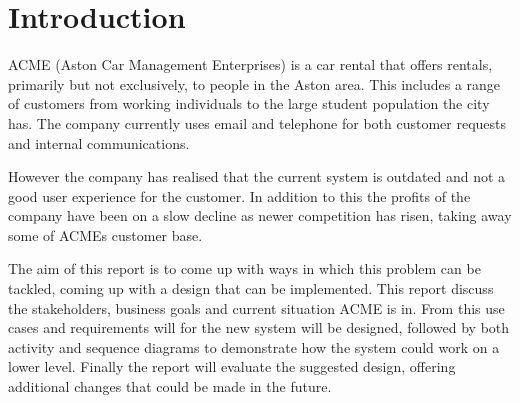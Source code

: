 \section{Introduction}
ACME (Aston Car Management Enterprises) is a car rental that offers rentals, primarily but not exclusively, to people in the Aston area.
This includes a range of customers from working individuals to the large student population the city has. The company currently uses email and telephone
for both customer requests and internal communications. 

However the company has realised that the current system is outdated and not a good user experience for the customer. In addition to this the 
profits of the company have been on a slow decline as newer competition has risen, taking away some of ACMEs customer base. 

The aim of this report is to come up with ways in which this problem can be tackled, coming up with a design that can be implemented. This report
discuss the stakeholders, business goals and current situation ACME is in. From this use cases and requirements will for the new system will be designed,
followed by both activity and sequence diagrams to demonstrate how the system could work on a lower level. Finally the report will evaluate the suggested
design, offering additional changes that could be made in the future.

\newpage
